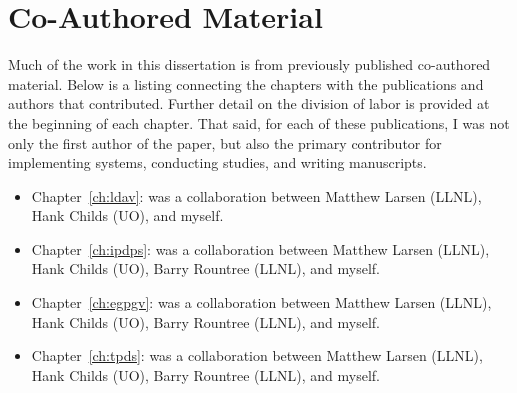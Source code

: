 \section{Co-Authored Material}
Much of the work in this dissertation is from previously published co-authored
material.
%
Below is a listing connecting the chapters with the publications and authors
that contributed.
%
Further detail on the division of labor is provided at the beginning of each
chapter.
%
That said, for each of these publications, I was not only the first author of
the paper, but also the primary contributor for implementing systems,
conducting studies, and writing manuscripts.
%
\begin{itemize}
%
\item Chapter~\ref{ch:ldav}: \cite{7348074} was a collaboration between Matthew Larsen
(LLNL), Hank Childs (UO), and myself.
%
\item Chapter~\ref{ch:ipdps}: \cite{ipdps2019.toappear} was a collaboration between Matthew
Larsen (LLNL), Hank Childs (UO), Barry Rountree (LLNL), and myself.
%
\item Chapter~\ref{ch:egpgv}: \cite{pgv.20171088} was a collaboration between Matthew Larsen
(LLNL), Hank Childs (UO), Barry Rountree (LLNL), and myself.
%
\item Chapter~\ref{ch:tpds}: \cite{paviz.journal.inprogress} was a collaboration between
Matthew Larsen (LLNL), Hank Childs (UO), Barry Rountree (LLNL), and myself.
%
\end{itemize}
